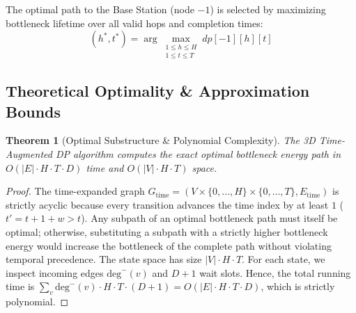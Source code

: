 \documentclass[journal]{IEEEtran}
\newtheorem{theorem}{Theorem}
\begin{document}
The optimal path to the Base Station (node $-1$) is selected by maximizing bottleneck lifetime over all valid hops and completion times:
\begin{equation}
(h^*, t^*) = \arg\max_{\substack{1 \le h \le H \\ 1 \le t \le T}} dp[-1][h][t]
\end{equation}

\subsection{Theoretical Optimality \& Approximation Bounds}
\begin{theorem}[Optimal Substructure \& Polynomial Complexity]
The 3D Time-Augmented DP algorithm computes the exact optimal bottleneck energy path in $O(|E| \cdot H \cdot T \cdot D)$ time and $O(|V| \cdot H \cdot T)$ space.
\end{theorem}
\begin{proof}
The time-expanded graph $G_{\text{time}} = (V \times \{0, \dots, H\} \times \{0, \dots, T\}, E_{\text{time}})$ is strictly acyclic because every transition advances the time index by at least $1$ ($t' = t + 1 + w > t$). Any subpath of an optimal bottleneck path must itself be optimal; otherwise, substituting a subpath with a strictly higher bottleneck energy would increase the bottleneck of the complete path without violating temporal precedence. The state space has size $|V| \cdot H \cdot T$. For each state, we inspect incoming edges $\text{deg}^-(v)$ and $D+1$ wait slots. Hence, the total running time is $\sum_{v} \text{deg}^-(v) \cdot H \cdot T \cdot (D+1) = O(|E| \cdot H \cdot T \cdot D)$, which is strictly polynomial.
\end{proof}
\end{document}
